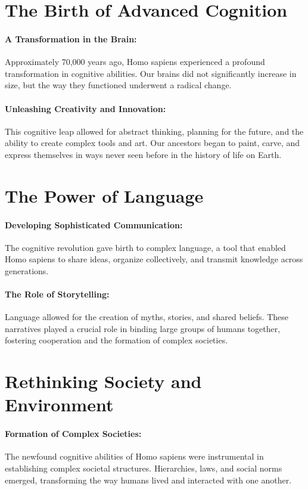\documentclass{book}
\begin{document}
\section*{The Birth of Advanced Cognition}

\paragraph{A Transformation in the Brain:}
Approximately 70,000 years ago, Homo sapiens experienced a profound transformation in cognitive abilities. Our brains did not significantly increase in size, but the way they functioned underwent a radical change.

\paragraph{Unleashing Creativity and Innovation:}
This cognitive leap allowed for abstract thinking, planning for the future, and the ability to create complex tools and art. Our ancestors began to paint, carve, and express themselves in ways never seen before in the history of life on Earth.

\section*{The Power of Language}

\paragraph{Developing Sophisticated Communication:}
The cognitive revolution gave birth to complex language, a tool that enabled Homo sapiens to share ideas, organize collectively, and transmit knowledge across generations.

\paragraph{The Role of Storytelling:}
Language allowed for the creation of myths, stories, and shared beliefs. These narratives played a crucial role in binding large groups of humans together, fostering cooperation and the formation of complex societies.

\section*{Rethinking Society and Environment}

\paragraph{Formation of Complex Societies:}
The newfound cognitive abilities of Homo sapiens were instrumental in establishing complex societal structures. Hierarchies, laws, and social norms emerged, transforming the way humans lived and interacted with one another.
\end{document}
